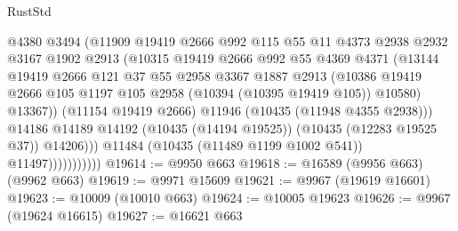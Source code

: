 \begin{lexlean}{RustStd}
\begin{coremodule}
{\begin{coremodule}
{{{{{{{{{{{{{{{{{{{{{{{{{{{{{{{{{{{{{{{{{{{{{{{{{{{{{{{{{{{{{{{{{{{{{{{{{{{{{{                                @4380
                                @3494
                                (@11909
                                  @19419
                                  @2666
                                  @992
                                  @115
                                  @55
                                  @11
                                  @4373
                                  @2938
                                  @2932
                                  @3167
                                  @1902
                                  @2913
                                  (@10315
                                    @19419
                                    @2666
                                    @992
                                    @55
                                    @4369
                                    @4371
                                    (@13144
                                      @19419
                                      @2666
                                      @121
                                      @37
                                      @55
                                      @2958
                                      @3367
                                      @1887
                                      @2913
                                      (@10386
                                        @19419
                                        @2666
                                        @105
                                        @1197
                                        @105
                                        @2958
                                        (@10394 (@10395 @19419 @105))
                                        @10580)
                                      @13367))
                                  (@11154 @19419 @2666)
                                  @11946
                                  (@10435 (@11948 @4355 @2938)))
                                @14186
                                @14189
                                @14192
                                (@10435 (@14194 @19525))
                                (@10435 (@12283 @19525 @37))
                                @14206)))
                          @11484
                          (@10435 (@11489 @1199 @1002 @541))
                          @11497)))))))))))
@19614 := @9950 @663
@19618 := @16589 (@9956 @663) (@9962 @663)
@19619 := @9971 @15609
@19621 := @9967 (@19619 @16601)
@19623 := @10009 (@10010 @663)
@19624 := @10005 @19623
@19626 := @9967 (@19624 @16615)
@19627 := @16621 @663
}}}}}}}}}}}}}}}}}}}}}}}}}}}}}}}}}}}}}}}}}}}}}}}}}}}}}}}}}}}}}}}}}}}}}}}}}}}}}}
\end{coremodule}}
\end{coremodule}
\end{lexlean}
